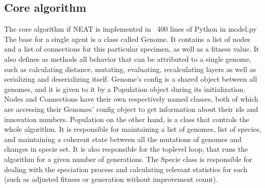 \documentclass{article}
\begin{document}
        \subsection{Core algorithm}
        The core algorithm if NEAT is implemented in ~400 lines of Python in model.py
        The base for a single agent is a class called Genome. It contains a list of nodes and a list of connections for this particular specimen,
        as well as a fitness value. It also defines as methods all behavior that can be attributed to a single genome,
        such as calculating distance, mutating, evaluating, recalculating layers as well as serializing and deserializing itself.
        Genome's config is a shared object between all genomes, and it is given to it by a Population object during its initialization.
        Nodes and Connections have their own respectively named classes, both of which are accessing
        their Genomes' config object to get information about their ids and innovation numbers.
        Population on the other hand, is a class that controls the whole algorithm. It is responsible for
        maintaining a list of genomes, list of species, and maintaining a coherent state between all the mutations of genomes and changes in specie set.
        It is also responsible for the toplevel loop, that runs the algorithm for a given number of generations.
        The Specie class is responsible for dealing with the speciation process and calculating relevant statistics for each (such as adjusted fitness or generation without improvement count). 
\end{document}
